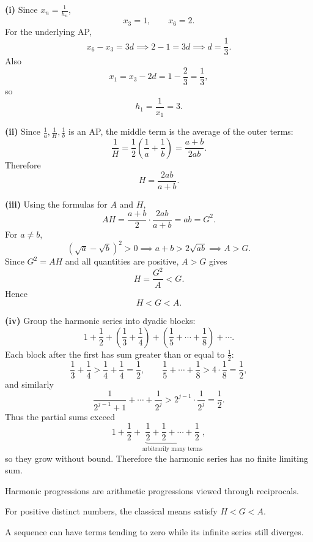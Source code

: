 \begin{solution}
\textbf{(i)} Since $x_n=\frac1{h_n}$,
\[
x_3=1,\qquad x_6=2.
\]
For the underlying AP,
\[
x_6-x_3=3d \implies 2-1=3d \implies d=\frac13.
\]
Also
\[
x_1=x_3-2d=1-\frac23=\frac13,
\]
so
\[
h_1=\frac1{x_1}=3.
\]

\textbf{(ii)} Since $\frac1a,\frac1H,\frac1b$ is an AP, the middle term is the average of the outer terms:
\[
\frac1H=\frac12\left(\frac1a+\frac1b\right)=\frac{a+b}{2ab}.
\]
Therefore
\[
H=\frac{2ab}{a+b}.
\]

\textbf{(iii)} Using the formulas for $A$ and $H$,
\[
AH=\frac{a+b}{2}\cdot\frac{2ab}{a+b}=ab=G^2.
\]
For $a\ne b$,
\[
(\sqrt a-\sqrt b)^2>0
\implies a+b>2\sqrt{ab}
\implies A>G.
\]
Since $G^2=AH$ and all quantities are positive, $A>G$ gives
\[
H=\frac{G^2}{A}<G.
\]
Hence
\[
H<G<A.
\]

\textbf{(iv)} Group the harmonic series into dyadic blocks:
\[
1+\frac12+\left(\frac13+\frac14\right)+\left(\frac15+\cdots+\frac18\right)+\cdots.
\]
Each block after the first has sum greater than or equal to $\frac12$:
\[
\frac13+\frac14>\frac14+\frac14=\frac12,\qquad
\frac15+\cdots+\frac18>4\cdot\frac18=\frac12,
\]
and similarly
\[
\frac1{2^{j-1}+1}+\cdots+\frac1{2^j}>2^{j-1}\cdot\frac1{2^j}=\frac12.
\]
Thus the partial sums exceed
\[
1+\frac12+\underbrace{\frac12+\frac12+\cdots+\frac12}_{\text{arbitrarily many terms}},
\]
so they grow without bound. Therefore the harmonic series has no finite limiting sum.
\end{solution}
\begin{takeaways}
\item Harmonic progressions are arithmetic progressions viewed through reciprocals.
\item For positive distinct numbers, the classical means satisfy $H<G<A$.
\item A sequence can have terms tending to zero while its infinite series still diverges.
\end{takeaways}


